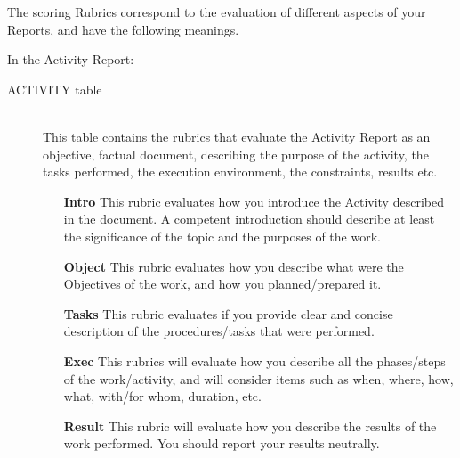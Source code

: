 \documentclass[a4paper,12pt,journal,twoside,compsoc]{PPIEEEtran}
\begin{document}
The scoring Rubrics correspond to the evaluation of different aspects of your Reports, and have the following meanings.

In the Activity Report:
\begin{description}
\item[ACTIVITY table]  \hfill \\
This table contains the rubrics that evaluate the Activity Report as an objective, factual document, describing the purpose of the activity, the tasks performed, the execution environment, the constraints, results etc. 
\begin{itemize}
\item[\textbf{Intro}] This rubric evaluates how you introduce the Activity described in the document. A competent introduction should describe at least the significance of the topic and the purposes of the work. 
\item[\textbf{Object}] This rubric evaluates how you describe what were the Objectives of the work, and how you planned/prepared it. 
\item[\textbf{Tasks}] This rubric evaluates if you provide clear and concise description of the procedures/tasks that were performed.
\item[\textbf{Exec}] This rubrics will evaluate how you describe all the phases/steps of the work/activity, and will consider items such as when, where, how, what, with/for whom, duration, etc.
\item[\textbf{Result}] This rubric will evaluate how you describe the results of the work performed. You should report your results neutrally.
\end{itemize}
\end{description}
\end{document}
